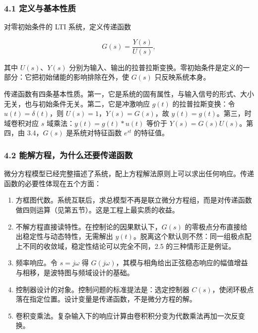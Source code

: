 \documentclass[12pt]{ctexart}
\providecommand{\tightlist}{\setlength{\itemsep}{0pt}\setlength{\parskip}{0pt}}
\begin{document}
\hypertarget{ux5b9aux4e49ux4e0eux57faux672cux6027ux8d28}{%
\subsubsection{4.1
定义与基本性质}\label{ux5b9aux4e49ux4e0eux57faux672cux6027ux8d28}}

对零初始条件的 LTI 系统，定义传递函数

\[
G(s)=\frac{Y(s)}{U(s)},
\]

其中 \(U(s)\)、\(Y(s)\)
分别为输入、输出的拉普拉斯变换。零初始条件是定义的一部分：它把初始储能的影响排除在外，使
\(G(s)\) 只反映系统本身。

传递函数有四条基本性质。第一，它是系统的固有属性，与输入信号的形式、大小无关，也与初始条件无关。第二，它是冲激响应
\(g(t)\) 的拉普拉斯变换：令 \(u(t)=\delta(t)\)，则
\(U(s)=1\)，\(Y(s)=G(s)\)，故 \(y(t)=g(t)\)。第三，时域卷积对应 \(s\)
域乘法：\(y(t)=g(t)*u(t)\) 等价于 \(Y(s)=G(s)U(s)\)。第四，由
3.4，\(G(s)\) 是系统对特征函数 \(e^{st}\) 的特征值。

\hypertarget{ux80fdux89e3ux65b9ux7a0bux4e3aux4ec0ux4e48ux8fd8ux8981ux4f20ux9012ux51fdux6570}{%
\subsubsection{4.2
能解方程，为什么还要传递函数}\label{ux80fdux89e3ux65b9ux7a0bux4e3aux4ec0ux4e48ux8fd8ux8981ux4f20ux9012ux51fdux6570}}

微分方程模型已经完整描述了系统，配上方程解法原则上可以求出任何响应。传递函数的必要性体现在五个方面：

\begin{enumerate}
\def\labelenumi{\arabic{enumi}.}
\tightlist
\item
  方框图代数。系统互联后，求总模型不再是联立微分方程组，而是对传递函数做四则运算（见第五节）。这是工程上最实质的收益。
\item
  不解方程直接读特性。在控制论的因果默认下，\(G(s)\)
  的零极点分布直接给出稳定性与动态特性，无需解出
  \(y(t)\)。脱离这个默认则不然：同一组极点配上不同的收敛域，稳定性结论可以完全不同，2.5
  的三种情形正是例证。
\item
  频率响应。令 \(s=j\omega\) 得
  \(G(j\omega)\)，其模与相角给出正弦稳态响应的幅值增益与相移，是波特图与频域设计的基础。
\item
  控制器设计的对象。控制问题的标准提法是：选定控制器
  \(C(s)\)，使闭环极点落在指定位置。设计变量是传递函数，不是微分方程的解。
\item
  卷积变乘法。复杂输入下的响应计算由卷积积分变为代数乘法再加一次反变换。
\end{enumerate}
\end{document}
